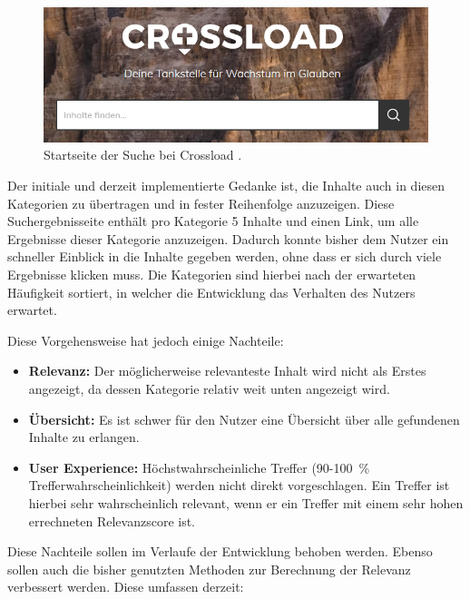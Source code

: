 \begin{figure}[h]
  \begin{centering}
    \includegraphics[width=\textwidth]{figures/foundations/crossloadSucheStart.png}
    \caption{Startseite der Suche bei Crossload \cite{pfleiderer2022}.}
    \label{fig:crossloadSucheStart}
  \end{centering}
\end{figure}

Der initiale und derzeit implementierte Gedanke ist, die Inhalte auch in diesen Kategorien zu übertragen und in fester Reihenfolge anzuzeigen.
Diese Suchergebnisseite enthält pro Kategorie 5 Inhalte und einen Link, um alle Ergebnisse dieser Kategorie anzuzeigen.
Dadurch konnte bisher dem Nutzer ein schneller Einblick in die Inhalte gegeben werden, ohne dass er sich durch viele Ergebnisse klicken muss.
Die Kategorien sind hierbei nach der erwarteten Häufigkeit sortiert, in welcher die Entwicklung das Verhalten des Nutzers erwartet.

Diese Vorgehensweise hat jedoch einige Nachteile:

\begin{itemize}
  \item \textbf{Relevanz:} Der möglicherweise relevanteste Inhalt wird nicht als Erstes angezeigt, da dessen Kategorie relativ weit unten angezeigt wird.
  \item \textbf{Übersicht:} Es ist schwer für den Nutzer eine Übersicht über alle gefundenen Inhalte zu erlangen.
  \item \textbf{User Experience:} Höchstwahrscheinliche Treffer (90-100 \% Trefferwahrscheinlichkeit) werden nicht direkt vorgeschlagen.
  Ein Treffer ist hierbei sehr wahrscheinlich relevant, wenn er ein Treffer mit einem sehr hohen errechneten Relevanzscore ist.
\end{itemize}

Diese Nachteile sollen im Verlaufe der Entwicklung behoben werden.
Ebenso sollen auch die bisher genutzten Methoden zur Berechnung der Relevanz verbessert werden.
Diese umfassen derzeit:

